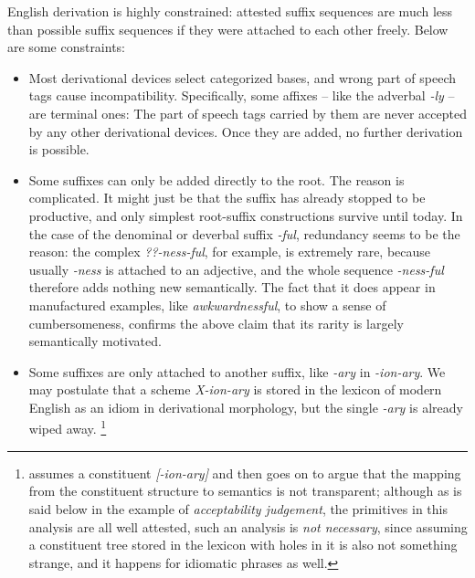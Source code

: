 \documentclass[UTF8, a4paper, oneside, scheme=plain, 12pt]{ctexbook}
\newcommand{\form}[1]{\emph{#1}}
\begin{document}
English derivation is highly constrained:
attested suffix sequences are much less than 
possible suffix sequences 
if they were attached to each other freely.
Below are some constraints:

\begin{itemize}
    \item Most derivational devices select categorized bases,
    and wrong part of speech tags cause incompatibility.
    Specifically, some affixes -- like the adverbal \form{-ly} -- are terminal ones:
    The part of speech tags carried by them are never accepted by any other derivational devices.
    Once they are added,
    no further derivation is possible. %

    \item Some suffixes can only be added directly to the root.
    The reason is complicated.
    It might just be that the suffix has already stopped to be productive,
    and only simplest root-suffix constructions survive until today.
    In the case of the denominal or deverbal suffix \form{-ful},
    redundancy seems to be the reason:
    the complex \form{??-ness-ful},
    for example, is extremely rare,
    because usually \form{-ness} is attached to an adjective,
    and the whole sequence \form{-ness-ful} therefore adds nothing new semantically.
    The fact that it does appear in manufactured examples, like \form{awkwardnessful},
    to show a sense of cumbersomeness,
    confirms the above claim that its rarity is largely semantically motivated.

    \item Some suffixes are only attached to another suffix, 
    like \form{-ary} in \form{-ion-ary}.
    We may postulate that a scheme \form{X-ion-ary} is stored in the 
    lexicon of modern English as an idiom in derivational morphology,
    but the single \form{-ary} is already wiped away.%
    \footnote{
        \citet{fabb1988english} assumes a constituent \form{[-ion-ary]}
        and then goes on to argue that the mapping from the constituent structure 
        to semantics is not transparent;
        although as is said below in the example of 
        \form{acceptability judgement}, 
        the primitives in this analysis are all well attested,
        such an analysis is \emph{not necessary},
        since assuming a constituent tree stored in the lexicon 
        with holes in it
        is also not something strange,
        and it happens for idiomatic phrases as well.
    }


\end{itemize}
\end{document}
